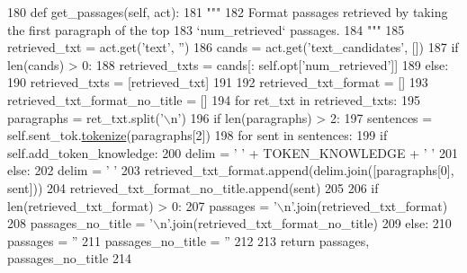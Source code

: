 \begin{DoxyCode}
180     \textcolor{keyword}{def }get\_passages(self, act):
181         \textcolor{stringliteral}{"""}
182 \textcolor{stringliteral}{        Format passages retrieved by taking the first paragraph of the top}
183 \textcolor{stringliteral}{        `num\_retrieved` passages.}
184 \textcolor{stringliteral}{        """}
185         retrieved\_txt = act.get(\textcolor{stringliteral}{'text'}, \textcolor{stringliteral}{''})
186         cands = act.get(\textcolor{stringliteral}{'text\_candidates'}, [])
187         \textcolor{keywordflow}{if} len(cands) > 0:
188             retrieved\_txts = cands[: self.opt[\textcolor{stringliteral}{'num\_retrieved'}]]
189         \textcolor{keywordflow}{else}:
190             retrieved\_txts = [retrieved\_txt]
191 
192         retrieved\_txt\_format = []
193         retrieved\_txt\_format\_no\_title = []
194         \textcolor{keywordflow}{for} ret\_txt \textcolor{keywordflow}{in} retrieved\_txts:
195             paragraphs = ret\_txt.split(\textcolor{stringliteral}{'\(\backslash\)n'})
196             \textcolor{keywordflow}{if} len(paragraphs) > 2:
197                 sentences = self.sent\_tok.\hyperlink{namespaceparlai_1_1agents_1_1tfidf__retriever_1_1build__tfidf_a1fdb457e98eb4e4c26047e229686a616}{tokenize}(paragraphs[2])
198                 \textcolor{keywordflow}{for} sent \textcolor{keywordflow}{in} sentences:
199                     \textcolor{keywordflow}{if} self.add\_token\_knowledge:
200                         delim = \textcolor{stringliteral}{' '} + TOKEN\_KNOWLEDGE + \textcolor{stringliteral}{' '}
201                     \textcolor{keywordflow}{else}:
202                         delim = \textcolor{stringliteral}{' '}
203                     retrieved\_txt\_format.append(delim.join([paragraphs[0], sent]))
204                     retrieved\_txt\_format\_no\_title.append(sent)
205 
206         \textcolor{keywordflow}{if} len(retrieved\_txt\_format) > 0:
207             passages = \textcolor{stringliteral}{'\(\backslash\)n'}.join(retrieved\_txt\_format)
208             passages\_no\_title = \textcolor{stringliteral}{'\(\backslash\)n'}.join(retrieved\_txt\_format\_no\_title)
209         \textcolor{keywordflow}{else}:
210             passages = \textcolor{stringliteral}{''}
211             passages\_no\_title = \textcolor{stringliteral}{''}
212 
213         \textcolor{keywordflow}{return} passages, passages\_no\_title
214 
\end{DoxyCode}
\mbox{\label{classprojects_1_1wizard__of__wikipedia_1_1knowledge__retriever_1_1knowledge__retriever_1_1KnowledgeRetrieverAgent_a2801dcbb7f6d0c021b4e8778498abcb7}} 
